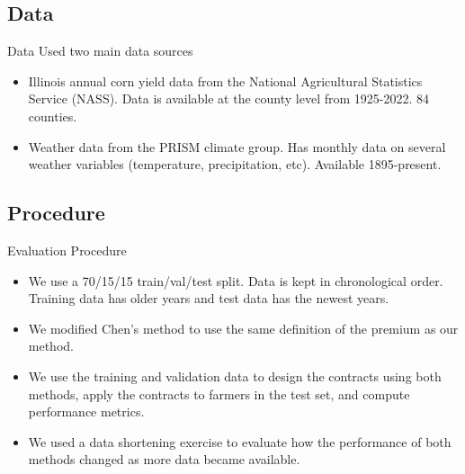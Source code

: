 \documentclass{beamer}
\begin{document}
\subsection{Data}
\begin{frame}{Data}
    Used two main data sources
    \begin{itemize}
        \setlength\itemsep{2em}
        \item Illinois annual corn yield data from the National Agricultural Statistics Service (NASS). Data is available at the county level from 1925-2022. 84 counties. 
        \item Weather data from the PRISM climate group. Has monthly data on several weather variables (temperature, precipitation, etc). Available 1895-present.
    \end{itemize}
\end{frame}

\subsection{Procedure}
\begin{frame}{Evaluation Procedure}
    \begin{itemize}
        \setlength\itemsep{2em}
        \item We use a 70/15/15 train/val/test split. Data is kept in chronological order. Training data has older years and test data has the newest years. 
        \item We modified Chen's method to use the same definition of the premium as our method. 
        \item We use the training and validation data to design the contracts using both methods, apply the contracts to farmers in the test set, and compute performance metrics. 
        \item We used a data shortening exercise to evaluate how the performance of both methods changed as more data became available. 
    \end{itemize}
\end{frame}
\end{document}
